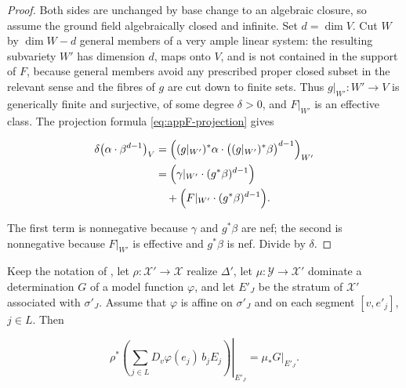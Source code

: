 \begin{proof}
Both sides are unchanged by base change to an algebraic closure, so assume
the ground field algebraically closed and infinite.  Set \(d=\dim V\).  Cut
\(W\) by \(\dim W-d\) general members of a very ample linear system: the
resulting subvariety \(W'\) has dimension \(d\), maps onto \(V\), and is not
contained in the support of \(F\), because general members avoid any
prescribed proper closed subset in the relevant sense and the fibres of
\(g\) are cut down to finite sets.  Thus \(g|_{W'}:W'\to V\) is generically
finite and surjective, of some degree \(\delta>0\), and \(F|_{W'}\) is an
effective class.  The projection formula
\eqref{eq:appF-projection} gives

\[
 \begin{aligned}
 \delta\bigl(\alpha\cdot\beta^{d-1}\bigr)_V
 &=\Bigl((g|_{W'})^*\alpha\cdot
    \bigl((g|_{W'})^*\beta\bigr)^{d-1}\Bigr)_{W'}\\
 &=\Bigl(\gamma|_{W'}\cdot(g^*\beta)^{d-1}\Bigr)\\
 &\quad+\Bigl(F|_{W'}\cdot(g^*\beta)^{d-1}\Bigr).
 \end{aligned}
\]

The first term is nonnegative because \(\gamma\) and \(g^*\beta\) are nef;
the second is nonnegative because \(F|_{W'}\) is effective and
\(g^*\beta\) is nef.  Divide by \(\delta\).
\end{proof}

\begin{lemma}
\label{lem:ch22-restriction-identity}
Keep the notation of , let
\(\rho:\mathcal X'\to\mathcal X\) realize \(\Delta'\), let
\(\mu:\mathcal Y\to\mathcal X'\) dominate a determination \(G\) of a model
function \(\varphi\), and let \(E'_J\) be the stratum of \(\mathcal X'\)
associated with \(\sigma'_J\).  Assume that \(\varphi\) is affine on
\(\sigma'_J\) and on each segment \([v,e'_j]\), \(j\in L\).  Then

\[
 \left.
 \rho^*\!\left(\sum_{j\in L}D_v\varphi(e_j)\,b_jE_j\right)
 \right|_{E'_J}
       =\left.\mu_*G\right|_{E'_J}.
\tag{22.40}\label{eq:ch22-slope-divisor-identity}
\]
\end{lemma}

